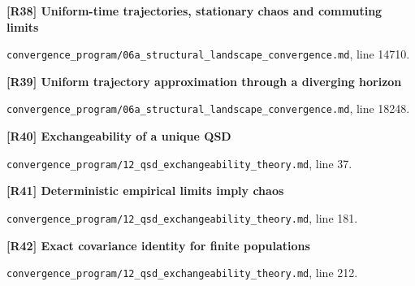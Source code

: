 \documentclass[11pt,a4paper]{article}
\begin{document}
\par\medskip\noindent\begin{minipage}{\linewidth}\textbf{[R38] Uniform-time trajectories, stationary chaos and commuting limits}\label{src:cor-slcw-trajectories}\par
{\small\texttt{}\par
\nolinkurl{convergence_program/06a_structural_landscape_convergence.md}, line 14710.\par}
\end{minipage}\par

\par\medskip\noindent\begin{minipage}{\linewidth}\textbf{[R39] Uniform trajectory approximation through a diverging horizon}\label{src:thm-slcgt-growing-trajectory}\par
{\small\texttt{}\par
\nolinkurl{convergence_program/06a_structural_landscape_convergence.md}, line 18248.\par}
\end{minipage}\par

\par\medskip\noindent\begin{minipage}{\linewidth}\textbf{[R40] Exchangeability of a unique QSD}\label{src:thm-qsd-exchangeability}\par
{\small\texttt{}\par
\nolinkurl{convergence_program/12_qsd_exchangeability_theory.md}, line 37.\par}
\end{minipage}\par

\par\medskip\noindent\begin{minipage}{\linewidth}\textbf{[R41] Deterministic empirical limits imply chaos}\label{src:thm-propagation-chaos-qsd}\par
{\small\texttt{}\par
\nolinkurl{convergence_program/12_qsd_exchangeability_theory.md}, line 181.\par}
\end{minipage}\par

\par\medskip\noindent\begin{minipage}{\linewidth}\textbf{[R42] Exact covariance identity for finite populations}\label{src:thm-correlation-decay}\par
{\small\texttt{}\par
\nolinkurl{convergence_program/12_qsd_exchangeability_theory.md}, line 212.\par}
\end{minipage}\par
\end{document}
